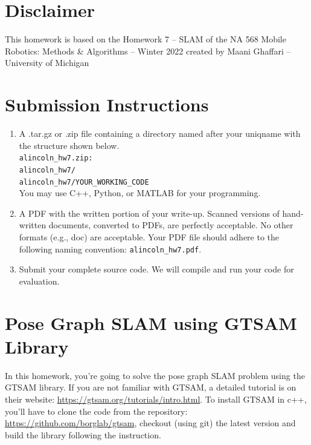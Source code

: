 \documentclass[tp]{lcc}
\begin{document}
\maketitle


\section*{Disclaimer}
This homework is based on the Homework 7 -- SLAM of the NA 568 Mobile Robotics: Methods \& Algorithms -- Winter 2022 created by Maani Ghaffari -- University of Michigan

\section*{Submission Instructions}

\begin{enumerate}
    \item A .tar.gz or .zip file containing a directory named after your uniqname with the structure shown below. \\
    \lstinline[style=bash]{alincoln_hw7.zip:} \\
    \lstinline[style=bash]{alincoln_hw7/} \\
    \lstinline[style=bash]{alincoln_hw7/YOUR_WORKING_CODE} \\
    You may use C++, Python, or MATLAB for your programming.

    \item A PDF with the written portion of your write-up. Scanned versions of hand-written documents, converted to PDFs, are perfectly acceptable. No other formats (e.g., doc) are acceptable. Your PDF file should adhere to the following naming convention: \lstinline[style=bash]{alincoln_hw7.pdf}.

    \item Submit your complete source code. We will compile and run your code for evaluation.
\end{enumerate}

\section*{Pose Graph SLAM using GTSAM Library}
In this homework, you’re going to solve the pose graph SLAM problem using the GTSAM library. If you are not familiar with GTSAM, a detailed tutorial is on their website: \url{https://gtsam.org/tutorials/intro.html}. To install GTSAM in c++, you’ll have to clone the code from the repository: \url{https://github.com/borglab/gtsam}, checkout (using git) the latest version and build the library following the instruction.
\end{document}
